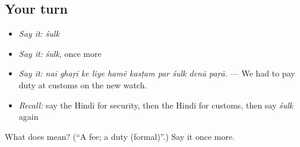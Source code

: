 \subsection*{Your turn}
\begin{itemize}
\raggedright
  \item \emph{Say it:} \emph{śulk}
  \item \emph{Say it:} \emph{śulk}, once more
  \item \emph{Say it:} \emph{naī ghaṛī ke liye hamẽ kasṭam par śulk denā paṛā.} — We had to pay duty at customs on the new watch.
  \item \emph{Recall:} say the Hindi for security, then the Hindi for customs, then say \emph{śulk} again
\end{itemize}

\begin{tcolorbox}[breakable,colback=teal!4,colframe=teal!35!black,title={Before you move on}]
What does  mean? (\textquotedblleft{}A fee; a duty (formal)\textquotedblright{}.) Say it once more.
\end{tcolorbox}
